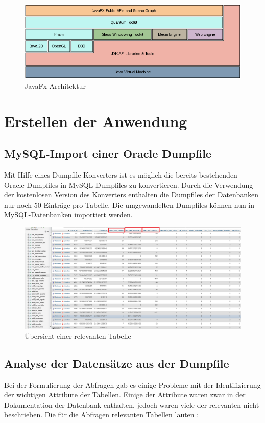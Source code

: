 \documentclass[a4paper, 12pt]{scrartcl}
\begin{document}
\begin{figure}[h]
	\centering
	\includegraphics[scale=0.5]{javafx.png}
	\caption{JavaFx Architektur}
	\label{img:JavaFX}
\end{figure}

\section{Erstellen der Anwendung}

\subsection{MySQL-Import einer Oracle Dumpfile}

Mit Hilfe eines Dumpfile-Konverters ist es möglich die bereits bestehenden Oracle-Dumpfiles in MySQL-Dumpfiles zu konvertieren. Durch die Verwendung der kostenlosen Version des Konverters enthalten die Dumpfiles der Datenbanken nur noch 50 Einträge pro Tabelle. 
Die umgewandelten Dumpfiles können nun in MySQL-Datenbanken importiert werden.

\begin{figure}[h]
	\centering
	\includegraphics[scale=0.4]{Datenbank.png}
	\caption{Übersicht einer relevanten Tabelle}
	\label{img:grafik-DB}
\end{figure}

\subsection{Analyse der Datensätze aus der Dumpfile}
Bei der Formulierung der Abfragen gab es einige Probleme mit der Identifizierung der wichtigen Attribute der Tabellen. Einige der Attribute waren zwar in der Dokumentation der Datenbank enthalten, jedoch waren viele der relevanten nicht beschrieben.
\newline Die für die Abfragen relevanten Tabellen lauten :
\end{document}

